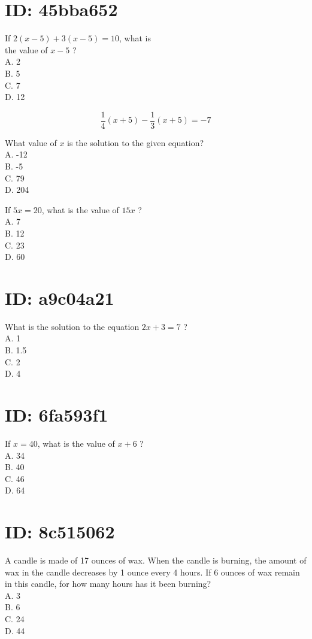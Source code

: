 \section*{ID: 45bba652}
If $2(x-5)+3(x-5)=10$, what is\\
the value of $x-5$ ?\\
A. 2\\
B. 5\\
C. 7\\
D. 12

$$
\frac{1}{4}(x+5)-\frac{1}{3}(x+5)=-7
$$

What value of $x$ is the solution to the given equation?\\
A. -12\\
B. -5\\
C. 79\\
D. 204

If $5 x=20$, what is the value of $15 x$ ?\\
A. 7\\
B. 12\\
C. 23\\
D. 60

\section*{ID: a9c04a21}
What is the solution to the equation $2 x+3=7$ ?\\
A. 1\\
B. 1.5\\
C. 2\\
D. 4

\section*{ID: 6fa593f1}
If $x=40$, what is the value of $x+6$ ?\\
A. 34\\
B. 40\\
C. 46\\
D. 64

\section*{ID: 8c515062}
A candle is made of 17 ounces of wax. When the candle is burning, the amount of wax in the candle decreases by 1 ounce every 4 hours. If 6 ounces of wax remain in this candle, for how many hours has it been burning?\\
A. 3\\
B. 6\\
C. 24\\
D. 44


